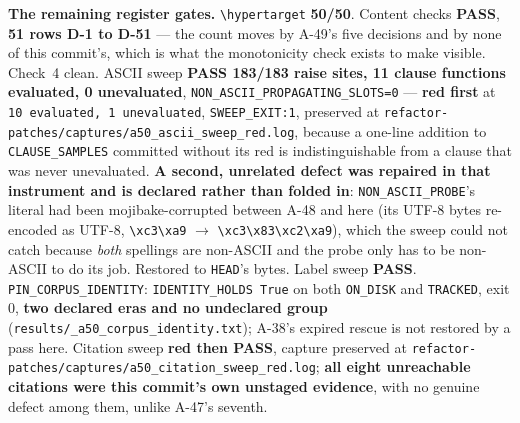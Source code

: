 \documentclass[
  10pt,
]{article}
\begin{document}
\textbf{The remaining register gates.} \texttt{\textbackslash hypertarget} \textbf{50/50}. Content checks \textbf{PASS}, \textbf{51 rows D-1 to D-51} --- the count moves by A-49's five decisions and by none of this commit's, which is what the monotonicity check exists to make visible. Check~4 clean. ASCII sweep \textbf{PASS 183/183 raise sites, 11 clause functions evaluated, 0 unevaluated}, \texttt{NON\_ASCII\_PROPAGATING\_SLOTS=0} --- \textbf{red first} at \texttt{10 evaluated, 1 unevaluated}, \texttt{SWEEP\_EXIT:1}, preserved at \texttt{refactor-patches/\allowbreak{}captures/\allowbreak{}a50\_ascii\_sweep\_red.log}, because a one-line addition to \texttt{CLAUSE\_SAMPLES} committed without its red is indistinguishable from a clause that was never unevaluated. \textbf{A second, unrelated defect was repaired in that instrument and is declared rather than folded in}: \texttt{NON\_ASCII\_PROBE}'s literal had been mojibake-corrupted between A-48 and here (its UTF-8 bytes re-encoded as UTF-8, \texttt{\textbackslash xc3\textbackslash xa9} $\to$ \texttt{\textbackslash xc3\textbackslash x83\textbackslash xc2\textbackslash xa9}), which the sweep could not catch because \emph{both} spellings are non-ASCII and the probe only has to be non-ASCII to do its job. Restored to \texttt{HEAD}'s bytes. Label sweep \textbf{PASS}. \texttt{PIN\_CORPUS\_IDENTITY}: \texttt{IDENTITY\_HOLDS True} on both \texttt{ON\_DISK} and \texttt{TRACKED}, exit 0, \textbf{two declared eras and no undeclared group} (\texttt{results/\allowbreak{}\_a50\_corpus\_identity.txt}); A-38's expired rescue is not restored by a pass here. Citation sweep \textbf{red then PASS}, capture preserved at \texttt{refactor-patches/\allowbreak{}captures/\allowbreak{}a50\_citation\_sweep\_red.log}; \textbf{all eight unreachable citations were this commit's own unstaged evidence}, with no genuine defect among them, unlike A-47's seventh.
\end{document}
